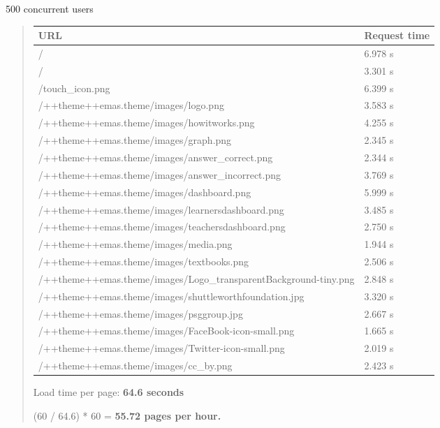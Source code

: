 \documentclass[letterpaper,10pt,english]{sphinxmanual}
\begin{document}
500 concurrent users
\begin{quote}

\begin{tabulary}{\linewidth}{|L|L|}
\hline
\textbf{\relax 
URL
} & \textbf{\relax 
Request time
}\\\hline

/
 & 
6.978 s
\\\hline

/
 & 
3.301 s
\\\hline

/touch\_icon.png
 & 
6.399 s
\\\hline

/++theme++emas.theme/images/logo.png
 & 
3.583 s
\\\hline

/++theme++emas.theme/images/howitworks.png
 & 
4.255 s
\\\hline

/++theme++emas.theme/images/graph.png
 & 
2.345 s
\\\hline

/++theme++emas.theme/images/answer\_correct.png
 & 
2.344 s
\\\hline

/++theme++emas.theme/images/answer\_incorrect.png
 & 
3.769 s
\\\hline

/++theme++emas.theme/images/dashboard.png
 & 
5.999 s
\\\hline

/++theme++emas.theme/images/learnersdashboard.png
 & 
3.485 s
\\\hline

/++theme++emas.theme/images/teachersdashboard.png
 & 
2.750 s
\\\hline

/++theme++emas.theme/images/media.png
 & 
1.944 s
\\\hline

/++theme++emas.theme/images/textbooks.png
 & 
2.506 s
\\\hline

/++theme++emas.theme/images/Logo\_transparentBackground-tiny.png
 & 
2.848 s
\\\hline

/++theme++emas.theme/images/shuttleworthfoundation.jpg
 & 
3.320 s
\\\hline

/++theme++emas.theme/images/psggroup.jpg
 & 
2.667 s
\\\hline

/++theme++emas.theme/images/FaceBook-icon-small.png
 & 
1.665 s
\\\hline

/++theme++emas.theme/images/Twitter-icon-small.png
 & 
2.019 s
\\\hline

/++theme++emas.theme/images/cc\_by.png
 & 
2.423 s
\\\hline
\end{tabulary}


Load time per page: \textbf{64.6 seconds}

(60 / 64.6) * 60 = \textbf{55.72 pages per hour.}
\end{quote}
\end{document}
